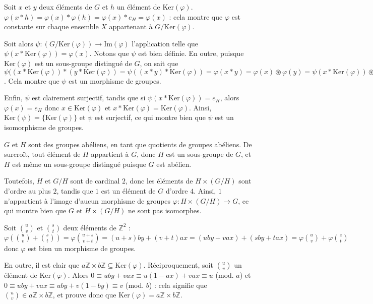 \begin{sol}
Soit $x$ et $y$ deux éléments de $G$ et $h$ un élément de $\mathrm{Ker}(\varphi)$.
$\varphi(x \ast h) = \varphi(x) \ast \varphi(h) = \varphi(x) \ast e_H = \varphi(x)$ :
cela montre que $\varphi$ est constante sur chaque ensemble $X$ appartenant à $G / \mathrm{Ker}(\varphi)$.

Soit alors $\psi : (G / \mathrm{Ker}(\varphi)) \to \mathrm{Im}(\varphi)$ l'application telle que
$\psi(x \ast \mathrm{Ker}(\varphi)) = \varphi(x)$.
Notons que $\psi$ est bien définie.
En outre, puisque $\mathrm{Ker}(\varphi)$ est un sous-groupe distingué de $G$, on sait que
$\psi((x \ast \mathrm{Ker}(\varphi)) \ast (y \ast \mathrm{Ker}(\varphi)) =
\psi((x \ast y) \ast \mathrm{Ker}(\varphi)) = \varphi(x \ast y) = \varphi(x) \circledast \varphi(y) =
\psi(x \ast \mathrm{Ker}(\varphi)) \circledast \psi(y \ast \mathrm{Ker}(\varphi))$.
Cela montre que $\psi$ est un morphisme de groupes.

Enfin, $\psi$ est clairement surjectif, tandis que si
$\psi(x \ast \mathrm{Ker}(\varphi)) = e_H$, alors
$\varphi(x) = e_H$ donc $x \in \mathrm{Ker}(\varphi)$ et
$x \ast \mathrm{Ker}(\varphi) = \mathrm{Ker}(\varphi)$.
Ainsi, $\mathrm{Ker}(\psi) = \{\mathrm{Ker}(\varphi)\}$ et
$\psi$ est surjectif, ce qui montre bien que
$\psi$ est un isomorphisme de groupes.
\end{sol}

\begin{sol}
$G$ et $H$ sont des groupes abéliens, en tant que quotients de groupes abéliens.
De surcroît, tout élément de $H$ appartient à $G$, donc $H$ est un sous-groupe de $G$,
et $H$ est même un sous-groupe distingué puisque $G$ est abélien.

Toutefois, $H$ et $G/H$ sont de cardinal $2$, donc
les éléments de $H \times (G / H)$ sont d'ordre au plus $2$, tandis que
$1$ est un élément de $G$ d'ordre $4$.
Ainsi, $1$ n'appartient à l'image
d'aucun morphisme de groupes $\varphi : H \times (G / H) \to G$,
ce qui montre bien que $G$ et $H \times (G / H)$ ne sont pas isomorphes.
\end{sol}

\begin{sol}
Soit $\binom{u}{v}$ et $\binom{s}{t}$ deux éléments de $\mathbb{Z}^2$ :
$\varphi\left(\binom{u}{v}+\binom{s}{t}\right) = \varphi\binom{u+s}{v+t} =
(u + s) b y + (v + t) a x = (u b y + v a x) + (s b y + t a x) = \varphi\binom{u}{v} + \varphi\binom{z}{t}$ donc
$\varphi$ est bien un morphisme de groupes.

En outre, il est clair que
$a \mathbb{Z} \times b \mathbb{Z} \subseteq \mathrm{Ker}(\varphi)$.
Réciproquement, soit $\binom{u}{v}$ un élément de $\mathrm{Ker}(\varphi)$. Alors
$0 \equiv u b y + v a x \equiv u (1 - a x) + v a x \equiv u$ (mod. $a$) et
$0 \equiv u b y + v a x \equiv u b y + v (1 - b y) \equiv v$ (mod. $b$) :
cela signifie que $\binom{u}{v} \in a \mathbb{Z} \times b \mathbb{Z}$, et prouve donc que
$\mathrm{Ker}(\varphi) = a \mathbb{Z} \times b \mathbb{Z}$.
\end{sol}

